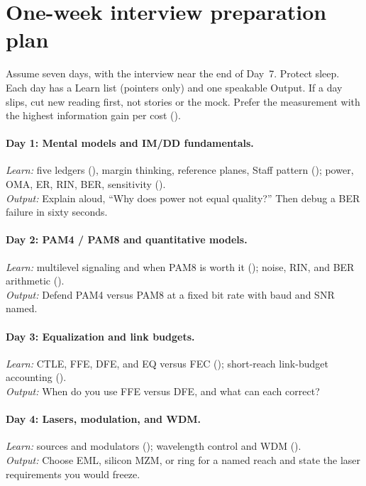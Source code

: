 \section{One-week interview preparation plan}
\label{sec:interview-week-plan}

Assume seven days, with the interview near the end of Day~7. Protect sleep.
Each day has a Learn list (pointers only) and one speakable Output. If a day
slips, cut new reading first, not stories or the mock. Prefer the measurement
with the highest information gain per cost
().

\paragraph{Day 1: Mental models and IM/DD fundamentals.}
\textit{Learn:} five ledgers (), margin
thinking, reference planes, Staff pattern
(); power, OMA, ER, RIN, BER, sensitivity
().\\
\textit{Output:} Explain aloud, ``Why does power not equal quality?'' Then
debug a BER failure in sixty seconds.

\paragraph{Day 2: PAM4 / PAM8 and quantitative models.}
\textit{Learn:} multilevel signaling and when PAM8 is worth it
(); noise, RIN, and BER arithmetic
().\\
\textit{Output:} Defend PAM4 versus PAM8 at a fixed bit rate with baud and SNR
named.

\paragraph{Day 3: Equalization and link budgets.}
\textit{Learn:} CTLE, FFE, DFE, and EQ versus FEC
(); short-reach link-budget accounting
().\\
\textit{Output:} When do you use FFE versus DFE, and what can each correct?

\paragraph{Day 4: Lasers, modulation, and WDM.}
\textit{Learn:} sources and modulators (); wavelength
control and WDM ().\\
\textit{Output:} Choose EML, silicon MZM, or ring for a named reach and state
the laser requirements you would freeze.

